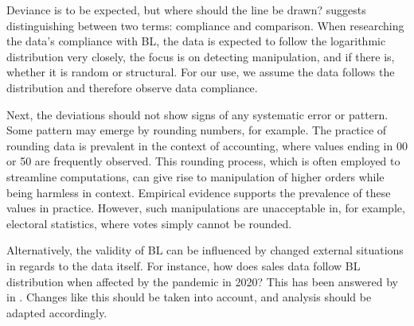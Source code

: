 

Deviance is to be expected, but where should the line be drawn?  \citeauthor{kossovsky2014benford} suggests distinguishing between two terms: compliance and comparison. When researching the data's compliance with BL, the data is expected to follow the logarithmic distribution very closely, the focus is on detecting manipulation, and if there is, whether it is random or structural. For our use, we assume the data follows the distribution and therefore observe data compliance.

Next, the deviations should not show signs of any systematic error or pattern. Some pattern may emerge by rounding numbers, for example. The practice of rounding data is prevalent in the context of accounting, where values ending in 00 or 50 are frequently observed. This rounding process, which is often employed to streamline computations, can give rise to manipulation of higher orders while being harmless in context. Empirical evidence supports the prevalence of these values in practice. 
However, such manipulations are unacceptable in, for example, electoral statistics, where votes simply cannot be rounded.
\cite{kossovsky2014benford} %

Alternatively, the validity of BL can be influenced by changed external situations in regards to the data itself. For instance, how does sales data follow BL distribution when affected by the pandemic in 2020? This has been answered by \citeauthor{Hronova2023} in \citeyear{Hronova2023}. Changes like this should be taken into account, and analysis should be adapted accordingly.




